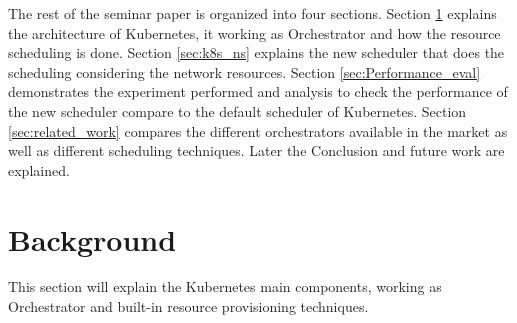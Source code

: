   The rest of the seminar paper is organized into four sections. Section \ref{sec:backgroud} explains the architecture of Kubernetes, it working as Orchestrator and how the resource scheduling is done. Section \ref{sec:k8s_ns} explains the new scheduler that does the scheduling considering the network resources. Section \ref{sec:Performance_eval} demonstrates the experiment performed and analysis to check the performance of the new scheduler compare to the default scheduler of Kubernetes. Section \ref{sec:related_work} compares the different orchestrators available in the market as well as different scheduling techniques. Later the Conclusion and future work are explained.
  \vspace{-0.10cm}
  \section{Background}
  \label{sec:backgroud}
  This section will explain the Kubernetes main components, working as Orchestrator and built-in resource provisioning techniques.
